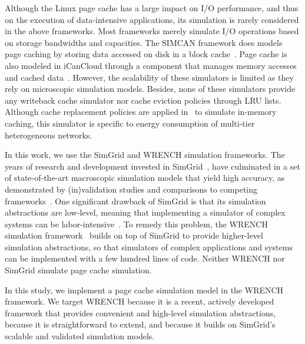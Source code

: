 \documentclass[conference]{IEEEtran}
\newcommand{\simgrid}{SimGrid\xspace}
\newcommand{\wrench}{WRENCH\xspace}
\begin{document}
        Although the Linux page cache has a large impact on I/O
        performance, and thus on the execution of data-intensive
        applications, its simulation is rarely considered in the above
        frameworks.  Most frameworks merely simulate I/O operations
        based on storage bandwidths and capacities.  The SIMCAN
        framework does models page caching by storing data accessed on
        disk in a block cache~\cite{nunez2012simcan}.  Page cache is
        also modeled in iCanCloud through a component that manages
        memory accesses and cached data~\cite{nunez2012icancloud}.
        However, the scalability of these simulators is limited
        as they rely on microscopic simulation models.  Besides, none
        of these simulators provide any writeback cache simulator nor
        cache eviction policies through LRU lists.  Although cache
        replacement policies are applied in~\cite{xu2018saving} to
        simulate in-memory caching, this simulator is specific to
        energy consumption of multi-tier heterogeneous networks.

        In this  work, we use the \simgrid and \wrench simulation
        frameworks.  The years of research and development invested in
        \simgrid~\cite{casanova2014simgrid}, have
        culminated in a set of state-of-the-art macroscopic simulation
        models that yield high accuracy, as demonstrated by
        (in)validation studies and comparisons to competing
        frameworks~\cite{smpi_validity, velhoTOMACS2013, simutool_09,
        nstools_07, lebre2015, pouilloux:hal-01197274,
        smpi_tpds2017,  7885814, 8048921, 7384330}.  One
        significant drawback of \simgrid is that its simulation
        abstractions are low-level, meaning that implementing a
        simulator of complex systems can be
        labor-intensive~\cite{kecskemeti_2014}. To remedy this problem,
        the \wrench simulation framework~\cite{casanova2020fgcs}
        builds on top of \simgrid to provide higher-level simulation
        abstractions, so that simulators of complex applications and
        systems can be implemented with a few hundred lines of code. 
        Neither \wrench nor \simgrid simulate page cache simulation.


	In this study, we implement a page cache simulation model in the
	\wrench framework. We target \wrench because it is a recent,
	actively developed framework that provides convenient and
	high-level simulation abstractions, because it is straightforward
	to extend, and because it builds on \simgrid's scalable and
	validated simulation models.
\end{document}
